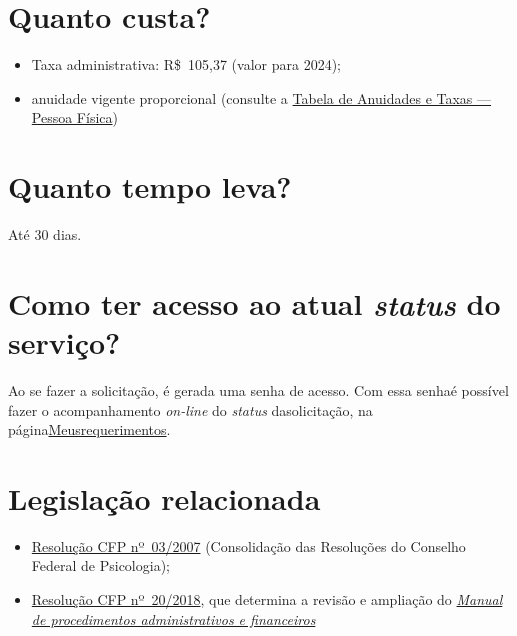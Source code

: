 \section{Quanto custa?}

\begin{itemize}
  \item  Taxa administrativa: R\$~105,37 (valor para 2024);
  \item  anuidade vigente proporcional (consulte a  \href{https://www.crpsp.org/pagina/view/206}{Tabela de Anuidades e  Taxas --- Pessoa Física})
\end{itemize}

\section{Quanto tempo leva?}

Até 30 dias.

\section{Como ter acesso ao atual \emph{status} do serviço?}

Ao se fazer a solicitação, é gerada uma senha de acesso. Com essa senhaé possível fazer o acompanhamento \emph{on-line} do \emph{status} dasolicitação, na página\href{https://cfpsp.brctotal.com/crp06_servicosonline/pgsRequerimento/Requerimentos.aspx}{Meusrequerimentos}.

\section{Legislação relacionada}

\begin{itemize}
  \item  \href{https://atosoficiais.com.br/cfp/resolucao-administrativa-financeira-n-3-2007-institui-a-consolidacao-das-resolucoes-do-conselho-federal-de-psicologia?origin=instituicao&q=resolu\%C3\%A7\%C3\%A3o\%203/2007}{Resolução  CFP nº~03/2007} (Consolidação das Resoluções do Conselho Federal de  Psicologia);
  \item  \href{https://transparencia.cfp.org.br/wp-content/uploads/sites/7/2020/05/Manual-de-Procedimentos-Administrativos-e-Financeiro-CFP-RES-20.2018.pdf}{\href{https://atosoficiais.com.br/cfp/resolucao-administrativa-financeira-n-20-2018-altera-o-manual-de-procedimentos-administrativo-e-financeiro-do-sistema-conselhos-de-psicologia-anexo-da-resolucao-cfp-n-202018-a-resolucao-cfp-n-03-2007-a-resolucao-cfp-n-16-2019-e-da-outras-providencias}{Resolução  CFP nº~20/2018}}, que determina a revisão e ampliação do  \href{https://transparencia.cfp.org.br/wp-content/uploads/sites/7/2020/05/Manual-de-Procedimentos-Administrativos-e-Financeiro-CFP-RES-20.2018.pdf}{\emph{Manual  de procedimentos administrativos e financeiros}}
\end{itemize}

